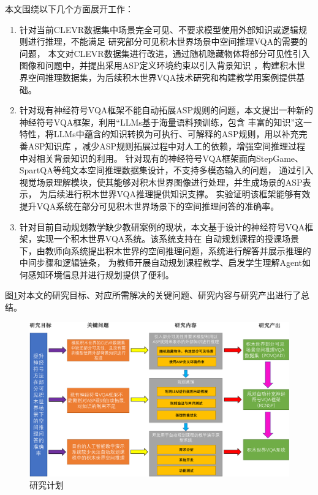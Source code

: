 本文围绕以下几个方面展开工作：
\begin{enumerate}[nosep]
\item 针对当前CLEVR数据集中场景完全可见、不要求模型使用外部知识或逻辑规则进行推理，不能满足
研究部分可见积木世界场景中空间推理VQA的需要的问题，
本文对CLEVR数据集进行改进，通过随机隐藏物体将部分可见性引入图像和问题中，并提出采用ASP定义环境约束以引入背景知识
，构建积木世界空间推理数据集，为后续积木世界VQA技术研究和构建教学用案例提供基础。
\item 针对现有神经符号VQA框架不能自动拓展ASP规则的问题，本文提出一种新的神经符号VQA框架，利用“LLMs基于海量语料预训练，包含
丰富的知识”这一特性，将LLMs中蕴含的知识转换为可执行、可解释的ASP规则，用以补充完善ASP知识库
，减少ASP规则拓展过程中对人工的依赖，增强空间推理过程中对相关背景知识的利用。
针对现有的神经符号VQA框架面向StepGame、SpartQA等纯文本空间推理数据集设计，不支持多模态输入的问题，
通过引入视觉场景理解模块，使其能够对积木世界图像进行处理，并生成场景的ASP表示，
为后续进行积木世界VQA推理提供知识支撑。
实验证明该框架能够有效提升VQA系统在部分可见积木世界场景下的空间推理问答的准确率。
\item 针对目前自动规划教学缺少教研案例的现状，本文基于设计的神经符号VQA框架，实现一个积木世界VQA系统。该系统支持在
自动规划课程的授课场景下，由教师向系统提出积木世界的空间推理问题，系统进行解答并展示推理的中间步骤和逻辑链条，
为教师开展自动规划课程教学、启发学生理解Agent如何感知环境信息并进行规划提供了便利。
\end{enumerate}

图\ref{plan}对本文的研究目标、对应所需解决的关键问题、研究内容与研究产出进行了总结。
\begin{figure}[h]
    \centering
    \includegraphics[width=\textwidth]{figures/研究方法-crop.pdf}
    \caption{研究计划}
    \label{plan}
\end{figure}
